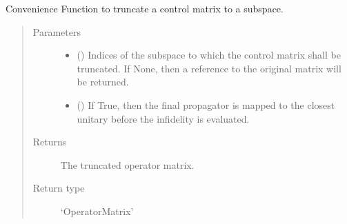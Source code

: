 \documentclass[letterpaper,10pt,english]{sphinxmanual}
\begin{document}
\begin{fulllineitems}
\begin{fulllineitems}
\end{fulllineitems}


\begin{fulllineitems}
\label{\detokenize{qsim:qsim.matrix.OperatorMatrix.truncate_to_subspace}}
Convenience Function to truncate a control matrix to a subspace.
\begin{quote}\begin{description}
\item[{Parameters}] \leavevmode\begin{itemize}
\item {} 
 (\sphinxstyleliteralemphasis{\sphinxupquote{, }}) \textendash{} Indices of the subspace to which the control matrix shall be
truncated. If None, then a reference to the original matrix will be
returned.

\item {} 
 () \textendash{} If True, then the final propagator is mapped to the closest unitary
before the infidelity is evaluated.

\end{itemize}

\item[{Returns}] \leavevmode
{} \textendash{} The truncated operator matrix.

\item[{Return type}] \leavevmode
‘OperatorMatrix’

\end{description}\end{quote}

\end{fulllineitems}


\end{fulllineitems}
\end{document}
